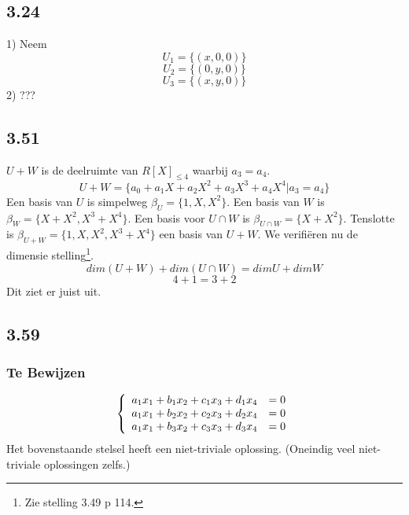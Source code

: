 \documentclass[lineaire_algebra_oplossingen.tex]{subfiles}
\begin{document}
\subsection{3.24}

1) 
Neem \\ 
$$U_1 = \{(x,0,0)\} $$
$$U_2 =  \{ (0,y,0)\} $$
$$U_3 = \{ (x,y,0)\} $$
2) ???

\subsection{3.51}
$U+W$ is de deelruimte van $R[X]_{\le4}$ waarbij $a_3 = a_4$.
\[U+W = \{a_0 + a_1 X + a_2 X^2 +a_3 X^3 + a_4 X^4 | a_3 = a_4\}\]
Een basis van $U$ is simpelweg $\beta_U = \{1,X,X^2\}$. Een basis van $W$ is $\beta_W = \{X+X^2,X^3+X^4\}$. Een basis voor $U\cap W$ is $\beta_{U\cap W} = \{X+X^2\}$. Tenslotte is $\beta_{U+W} = \{1,X,X^2,X^3+X^4\}$ een basis van $U+W$. We verifi\"eren nu de dimensie stelling\footnote{Zie stelling 3.49 p 114.}.
\[
dim(U+W) + dim(U\cap W) = dimU+dimW
\]
\[
4 + 1 = 3+2
\]
Dit ziet er juist uit.

\subsection{3.59}
\subsubsection*{Te Bewijzen}
\[
\left\lbrace
\begin{array}{c c}
a_1x_1 + b_1x_2 + c_1x_3 + d_1x_4 &= 0 \\
a_1x_1 + b_2x_2+ c_2x_3 + d_2x_4 &= 0 \\
a_1x_1 + b_3x_2+ c_3x_3 + d_3x_4 &= 0 \\
\end{array}
\right.
\]
Het bovenstaande stelsel heeft een niet-triviale oplossing. (Oneindig veel niet-triviale oplossingen zelfs.)
\end{document}
